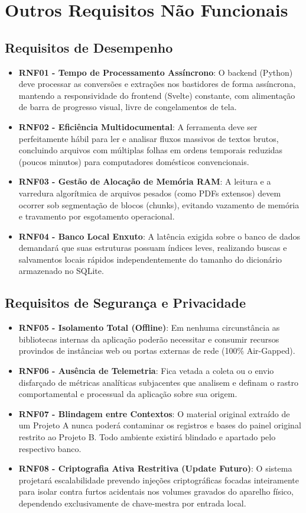 \documentclass{scrreprt}
\begin{document}
\chapter{Outros Requisitos Não Funcionais}

\section{Requisitos de Desempenho}
\begin{itemize}
    \item \textbf{RNF01 - Tempo de Processamento Assíncrono}: O backend (Python) deve processar as conversões e extrações nos bastidores de forma assíncrona, mantendo a responsividade do frontend (Svelte) constante, com alimentação de barra de progresso visual, livre de congelamentos de tela.
    \item \textbf{RNF02 - Eficiência Multidocumental}: A ferramenta deve ser perfeitamente hábil para ler e analisar fluxos massivos de textos brutos, concluindo arquivos com múltiplas folhas em ordens temporais reduzidas (poucos minutos) para computadores domésticos convencionais.
    \item \textbf{RNF03 - Gestão de Alocação de Memória RAM}: A leitura e a varredura algorítmica de arquivos pesados (como PDFs extensos) devem ocorrer sob segmentação de blocos (chunks), evitando vazamento de memória e travamento por esgotamento operacional.
    \item \textbf{RNF04 - Banco Local Enxuto}: A latência exigida sobre o banco de dados demandará que suas estruturas possuam índices leves, realizando buscas e salvamentos locais rápidos independentemente do tamanho do dicionário armazenado no SQLite.
\end{itemize}

\section{Requisitos de Segurança e Privacidade}
\begin{itemize}
    \item \textbf{RNF05 - Isolamento Total (Offline)}: Em nenhuma circunstância as bibliotecas internas da aplicação poderão necessitar e consumir recursos provindos de instâncias web ou portas externas de rede (100\% Air-Gapped).
    \item \textbf{RNF06 - Ausência de Telemetria}: Fica vetada a coleta ou o envio disfarçado de métricas analíticas subjacentes que analisem e definam o rastro comportamental e processual da aplicação sobre sua origem.
    \item \textbf{RNF07 - Blindagem entre Contextos}: O material original extraído de um Projeto A nunca poderá contaminar os registros e bases do painel original restrito ao Projeto B. Todo ambiente existirá blindado e apartado pelo respectivo banco.
    \item \textbf{RNF08 - Criptografia Ativa Restritiva (Update Futuro)}: O sistema projetará escalabilidade prevendo injeções criptográficas focadas inteiramente para isolar contra furtos acidentais nos volumes gravados do aparelho físico, dependendo exclusivamente de chave-mestra por entrada local.
\end{itemize}
\end{document}
